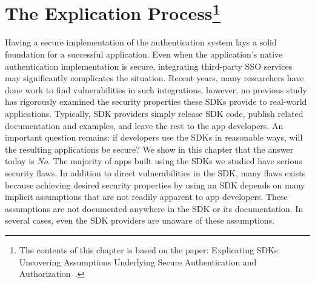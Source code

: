 \chapter[The Explication Process] {The Explication Process\footnote{The contents of this chapter is based on the paper: Explicating SDKs: Uncovering Assumptions Underlying Secure Authentication and Authorization~\cite{explicatingSDKs}.}}
\label{sec:explication}

Having a secure implementation of the authentication system lays a solid foundation for a successful application.  Even when the application's native authentication implementation is secure, integrating third-party SSO services may significantly complicates the situation.  Recent years, many researchers have done work to find vulnerabilities in such integrations, however, no previous study has rigorously examined the security properties these SDKs provide to real-world applications.  Typically, SDK providers simply release SDK code, publish related documentation and examples, and leave the rest to the app developers.  An important question remains: if developers use the SDKs in reasonable ways, will the resulting applications be secure?  We show in this chapter that the answer today is \emph{No}.  The majority of apps built using the SDKs we studied have serious security flaws.  In addition to direct vulnerabilities in the SDK, many flaws exists because achieving desired security properties by using an SDK depends on many implicit assumptions that are not readily apparent to app developers. These assumptions are not documented anywhere in the SDK or its documentation. In several cases, even the SDK providers are unaware of these assumptions.


